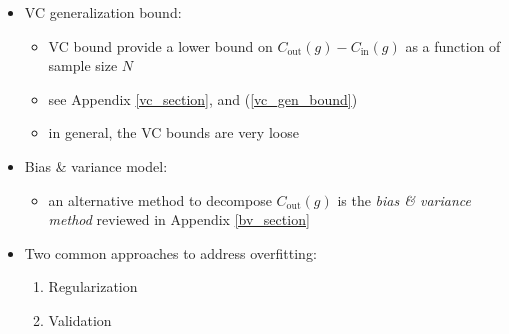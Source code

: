 \documentclass[onecolumn]{IEEEtran}
\newcommand{\bi}{\begin{itemize}}
\newcommand{\ei}{\end{itemize}}
\begin{document}
\begin{itemize}
    \item VC generalization bound:
    \bi
        \item VC bound provide a lower bound on $C_\text{out}(g) - C_\text{in}(g)$ as a function of sample size $N$
        \item see Appendix \ref{vc_section}, and (\ref{vc_gen_bound})
        \item in general, the VC bounds are very loose
    \ei
    \item Bias \& variance model:
    \bi
        \item an alternative method to decompose $C_\text{out}(g)$ is the \emph{bias \& variance method} reviewed in Appendix \ref{bv_section}
    \ei
    \item Two common approaches to address overfitting:
    \begin{enumerate}
      \item Regularization
      \item Validation
    \end{enumerate}
\end{itemize}


\end{document}
